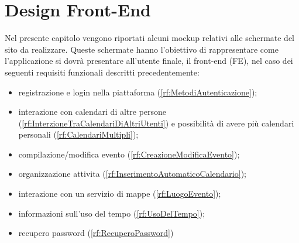 \section{Design Front-End}
\label{sec:RequisitiFrontEnd}

Nel presente capitolo vengono riportati alcuni mockup relativi alle schermate del sito da realizzare. Queste schermate hanno l'obiettivo di rappresentare come l'applicazione si dovrà presentare all'utente finale, il front-end (FE), nel caso dei seguenti requisiti funzionali descritti precedentemente:
\begin{itemize}
	\item registrazione e login nella piattaforma (\ref{rf:MetodiAutenticazione});
	\item interazione con calendari di altre persone (\ref{rf:InterzioneTraCalendariDiAltriUtenti}) e possibilità di avere più calendari personali (\ref{rf:CalendariMultipli});
	\item compilazione/modifica evento (\ref{rf:CreazioneModificaEvento});
	\item organizzazione attivita (\ref{rf:InserimentoAutomaticoCalendario});
	\item interazione con un servizio di mappe (\ref{rf:LuogoEvento});
	\item informazioni sull'uso del tempo (\ref{rf:UsoDelTempo});
	\item recupero password (\ref{rf:RecuperoPassword}) %
\end{itemize}

